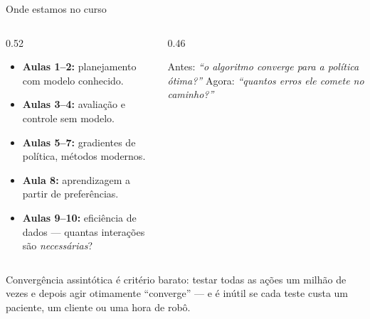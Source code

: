 \documentclass[aspectratio=169, 10pt]{beamer}
\begin{document}
\begin{frame}{Onde estamos no curso}
  \begin{columns}[T]
    \begin{column}{0.52\textwidth}
      \begin{itemize}
        \item \textbf{Aulas 1--2:} planejamento com modelo conhecido.
        \item \textbf{Aulas 3--4:} avaliação e controle sem modelo.
        \item \textbf{Aulas 5--7:} gradientes de política, métodos modernos.
        \item \textbf{Aula 8:} aprendizagem a partir de preferências.
        \item \textbf{Aulas 9--10:} \alert{eficiência de dados} — quantas
              interações são \emph{necessárias}?
      \end{itemize}
    \end{column}
    \begin{column}{0.46\textwidth}
      \begin{ideiabox}
        Antes: \emph{``o algoritmo converge para a política ótima?''}
        Agora: \emph{``quantos erros ele comete no caminho?''}
      \end{ideiabox}
    \end{column}
  \end{columns}

  \bigskip
  \begin{alertabox}
    Convergência assintótica é critério barato: testar todas as ações um
    milhão de vezes e depois agir otimamente ``converge'' — e é inútil se
    cada teste custa um paciente, um cliente ou uma hora de robô.
  \end{alertabox}
\end{frame}
\end{document}
